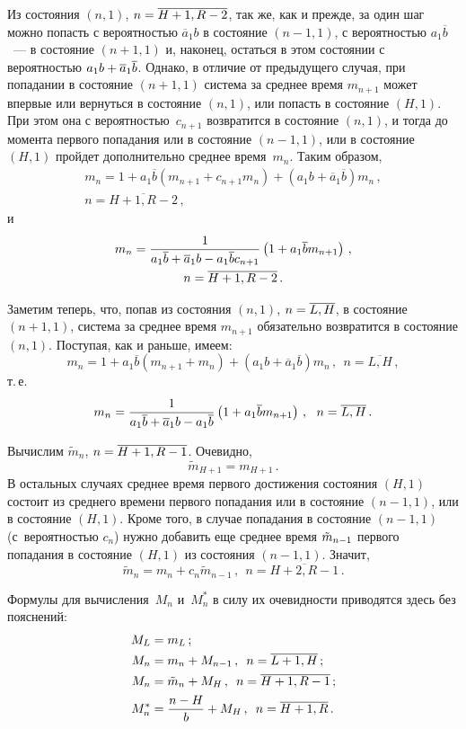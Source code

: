 \begin{multicols}{2}
Из состояния $(n,1)$, $n\hm=\overline{H+1,R-2}$,
так же, как и прежде, за один шаг можно попасть
с вероятностью $\overline{a}_1 b$  в состояние $(n-1,1)$,
с вероятностью $a_1 \overline{b}$~--- в состояние $(n+1,1)$
и, наконец, остаться в этом состоянии с
вероятностью $a_1 b \hm+ \overline{a}_1 \overline{b}$.
Однако, в отличие от предыдущего случая, при
попадании в состояние $(n+1,1)$ система за среднее
время $m_{n+1}$ может впервые или вернуться в
состояние $(n,1)$, или попасть в состояние $(H,1)$.
При этом она с вероятностью~$c_{n+1}$ возвратится в
состояние $(n,1)$, и тогда до момента первого попадания
или в состояние $(n-1,1)$, или в состояние $(H,1)$
пройдет дополнительно среднее время~$m_{n}$.
Таким образом,
\begin{multline*}
m_{n} = 1 + a_1 \overline{b} (m_{n+1} + c_{n+1} m_n)
+ (a_1 b + \overline{a}_1 \overline{b}) m_{n} \,,
\\ n=\overline{H+1,R-2}\,,
\end{multline*}
и
\begin{multline*}
m_{n} = \displaystyle\frac{\displaystyle 1\mathstrut}{\displaystyle a_1 \overline{b} + \overline{a}_1 b - a_1 \overline{b} c_{n+1}\mathstrut}
\left( 1 + a_1 \overline{b} m_{n+1} \right)\,,
\\ n=\overline{H+1,R-2}\,.
\end{multline*}

Заметим теперь, что, попав из состояния
$(n,1)$, $n\hm=\overline{L,H}$, в
состояние ${(n+1,1)}$,
система за среднее время $m_{n+1}$ обязательно
возвратится в состояние $(n,1)$. Поступая, как и раньше, имеем:
$$
m_{n} = 1 + a_1 \overline{b} (m_{n+1} + m_{n}) +
(a_1 b + \overline{a}_1 \overline{b}) m_{n}\,,
\ \ n=\overline{L,H}\,,
$$
т.\,е.
$$
m_{n} = \displaystyle\frac{\displaystyle 1\mathstrut}{\displaystyle a_1 \overline{b} + \overline{a}_1 b - a_1 \overline{b}\mathstrut}
\left( 1 + a_1 \overline{b} m_{n+1} \right)\,,
\ \ n=\overline{L,H}\,.
$$

Вычислим $\tilde{m}_{n}$, $n\hm=\overline{H+1,R-1}$. Очевидно,
$$
\tilde{m}_{H+1} = m_{H+1} \,.
$$
В остальных случаях среднее время первого
достижения состояния $(H,1)$ состоит из среднего
времени первого попадания или в
состояние $(n-1,1)$, или в состояние $(H,1)$.
Кроме того, в случае попадания в состояние $(n-1,1)$
(с~вероятностью $c_n$) нужно добавить еще среднее
время $\tilde m_{n-1}$ первого попадания в
состояние $(H,1)$ из состояния $(n-1,1)$.
Значит,
$$
\tilde{m}_{n} = m_n + c_n \tilde{m}_{n-1}\,,
\ \ n=\overline{H+2,R-1}\,.
$$

Формулы для вычисления~$M_n$ и~$M^*_n$ в силу их
очевидности приводятся здесь без пояснений:
\begin{align*}
M_{L} &= m_{L} \,;
\\
M_{n} &= m_n + M_{n-1} \,,
\enskip n=\overline{L+1,H}\,;
\\
M_{n} &= \tilde{m}_{n} + M_H \,,
\enskip  n=\overline{H+1,R-1}\,;
\\
M^*_{n} &= \displaystyle\frac{\displaystyle n-H\mathstrut}{\displaystyle b\mathstrut}+ M_H \,,
\enskip n=\overline{H+1,R}\,.
\end{align*}



\end{multicols}

